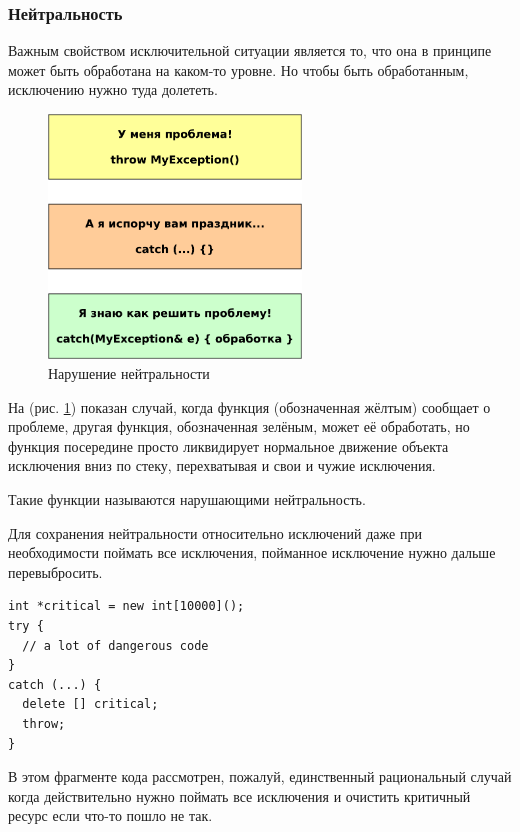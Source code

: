 \documentclass[a4paper,12pt,oneside]{article}
\begin{document}
\pagebreak
\subsubsection{Нейтральность}\label{subsub:neutrality}

Важным свойством исключительной ситуации является то, что она в принципе может быть обработана на каком-то уровне. Но чтобы быть обработанным, исключению нужно туда долететь.

\begin{figure}[ht]
\centering
\includegraphics[width=0.6\textwidth]{illustrations/exc-neutrality-crop.pdf}
\caption{Нарушение нейтральности}
\label{fig:exc_neutral}
\end{figure}

На (рис. \ref{fig:exc_neutral}) показан случай, когда функция (обозначенная жёлтым) сообщает о проблеме, другая функция, обозначенная зелёным, может её обработать, но функция посередине просто ликвидирует нормальное движение объекта исключения вниз по стеку, перехватывая и свои и чужие исключения.

Такие функции называются нарушающими нейтральность.

Для сохранения нейтральности относительно исключений даже при необходимости поймать все исключения, пойманное исключение нужно дальше перевыбросить.

\begin{lstlisting}
int *critical = new int[10000]();
try {
  // a lot of dangerous code
}
catch (...) {
  delete [] critical;
  throw;
}
\end{lstlisting}

В этом фрагменте кода рассмотрен, пожалуй, единственный рациональный случай когда действительно нужно поймать все исключения и очистить критичный ресурс если что-то пошло не так.
\end{document}
